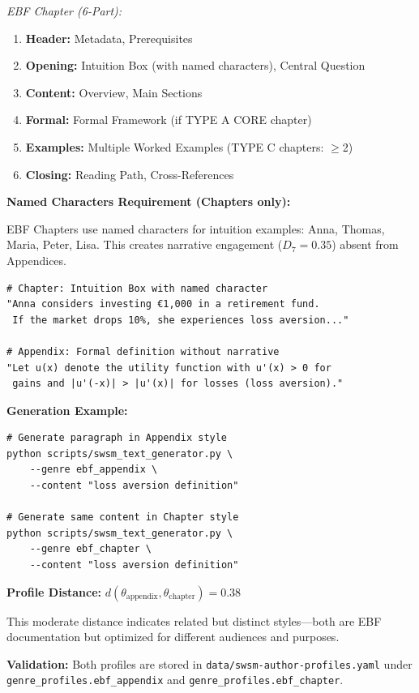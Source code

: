 \textit{EBF Chapter (6-Part):}
\begin{enumerate}
    \item \textbf{Header:} Metadata, Prerequisites
    \item \textbf{Opening:} Intuition Box (with named characters), Central Question
    \item \textbf{Content:} Overview, Main Sections
    \item \textbf{Formal:} Formal Framework (if TYPE A CORE chapter)
    \item \textbf{Examples:} Multiple Worked Examples (TYPE C chapters: $\geq$2)
    \item \textbf{Closing:} Reading Path, Cross-References
\end{enumerate}

\textbf{Named Characters Requirement (Chapters only):}

EBF Chapters use named characters for intuition examples: Anna, Thomas, Maria, Peter, Lisa. This creates narrative engagement ($D_7 = 0.35$) absent from Appendices.

\begin{verbatim}
# Chapter: Intuition Box with named character
"Anna considers investing €1,000 in a retirement fund.
 If the market drops 10%, she experiences loss aversion..."

# Appendix: Formal definition without narrative
"Let u(x) denote the utility function with u'(x) > 0 for
 gains and |u'(-x)| > |u'(x)| for losses (loss aversion)."
\end{verbatim}

\textbf{Generation Example:}
\begin{verbatim}
# Generate paragraph in Appendix style
python scripts/swsm_text_generator.py \
    --genre ebf_appendix \
    --content "loss aversion definition"

# Generate same content in Chapter style
python scripts/swsm_text_generator.py \
    --genre ebf_chapter \
    --content "loss aversion definition"
\end{verbatim}

\textbf{Profile Distance:} $d(\theta_{\text{appendix}}, \theta_{\text{chapter}}) = 0.38$

This moderate distance indicates related but distinct styles---both are EBF documentation but optimized for different audiences and purposes.

\textbf{Validation:} Both profiles are stored in \texttt{data/swsm-author-profiles.yaml} under \texttt{genre\_profiles.ebf\_appendix} and \texttt{genre\_profiles.ebf\_chapter}.


